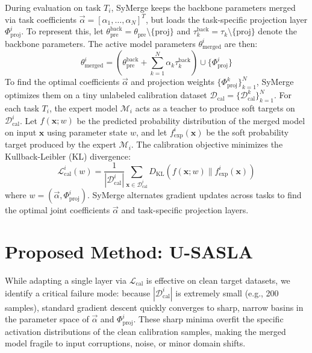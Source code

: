 \documentclass{article}
\theoremstyle{plain}
\theoremstyle{definition}
\theoremstyle{remark}
\begin{document}
During evaluation on task $T_i$, SyMerge keeps the backbone parameters merged via task coefficients $\vec{\alpha} = [\alpha_1, \dots, \alpha_N]^T$, but loads the task-specific projection layer $\Phi_{\text{proj}}^i$. To represent this, let $\theta_{\text{pre}}^{\text{back}} = \theta_{\text{pre}} \setminus \{\text{proj}\}$ and $\tau_k^{\text{back}} = \tau_k \setminus \{\text{proj}\}$ denote the backbone parameters. The active model parameters $\theta_{\text{merged}}^i$ are then:
\begin{equation}
    \theta_{\text{merged}}^i = \left( \theta_{\text{pre}}^{\text{back}} + \sum_{k=1}^N \alpha_k \tau_k^{\text{back}} \right) \cup \{\Phi_{\text{proj}}^i\}
\end{equation}
To find the optimal coefficients $\vec{\alpha}$ and projection weights $\{\Phi_{\text{proj}}^k\}_{k=1}^N$, SyMerge optimizes them on a tiny unlabeled calibration dataset $\mathcal{D}_{\text{cal}} = \{\mathcal{D}_{\text{cal}}^k\}_{k=1}^N$. For each task $T_i$, the expert model $\mathcal{M}_i$ acts as a teacher to produce soft targets on $\mathcal{D}_{\text{cal}}^i$. Let $f(\mathbf{x}; w)$ be the predicted probability distribution of the merged model on input $\mathbf{x}$ using parameter state $w$, and let $f_{\text{exp}}^i(\mathbf{x})$ be the soft probability target produced by the expert $\mathcal{M}_i$. The calibration objective minimizes the Kullback-Leibler (KL) divergence:
\begin{equation}
    \mathcal{L}_{\text{cal}}^i(w) = \frac{1}{|\mathcal{D}_{\text{cal}}^i|} \sum_{\mathbf{x} \in \mathcal{D}_{\text{cal}}^i} D_{\text{KL}}\left( f(\mathbf{x}; w) \parallel f_{\text{exp}}^i(\mathbf{x}) \right)
\end{equation}
where $w = (\vec{\alpha}, \Phi_{\text{proj}}^i)$. SyMerge alternates gradient updates across tasks to find the optimal joint coefficients $\vec{\alpha}$ and task-specific projection layers.

\section{Proposed Method: U-SASLA}
\label{method}

While adapting a single layer via $\mathcal{L}_{\text{cal}}$ is effective on clean target datasets, we identify a critical failure mode: because $|\mathcal{D}_{\text{cal}}^i|$ is extremely small (e.g., 200 samples), standard gradient descent quickly converges to sharp, narrow basins in the parameter space of $\vec{\alpha}$ and $\Phi_{\text{proj}}^i$. These sharp minima overfit the specific activation distributions of the clean calibration samples, making the merged model fragile to input corruptions, noise, or minor domain shifts.
\end{document}
